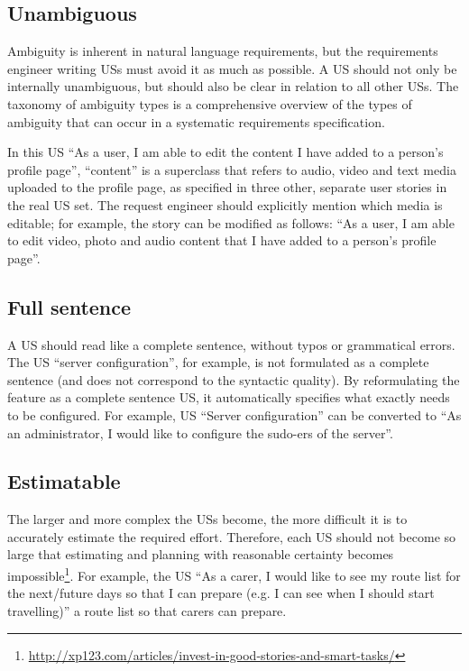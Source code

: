 \subsection*{\normalsize{Unambiguous}}
Ambiguity is inherent in natural language requirements, but the requirements engineer writing USs must avoid it as much as possible. A US should not only be internally unambiguous, but should also be clear in relation to all other USs. The taxonomy of ambiguity types \cite{berry2004ambiguity} is a comprehensive overview of the types of ambiguity that can occur in a systematic requirements specification.

In this US \enquote{As a user, I am able to edit the content I have added to a person's profile page}, \enquote{content} is a superclass that refers to audio, video and text media uploaded to the profile page, as specified in three other, separate user stories in the real US set. The request engineer should explicitly mention which media is editable; for example, the story can be modified as follows: \enquote{As a user, I am able to edit video, photo and audio content that I have added to a person's profile page}.
\subsection*{\normalsize{Full sentence}}
A US should read like a complete sentence, without typos or grammatical errors. The US \enquote{server configuration}, for example, is not formulated as a complete sentence (and does not correspond to the syntactic quality). By reformulating the feature as a complete sentence US, it automatically specifies what exactly needs to be configured. For example, US \enquote{Server configuration} can be converted to \enquote{As an administrator, I would like to configure the sudo-ers of the server}.
\subsection*{\normalsize{Estimatable}}
The larger and more complex the USs become, the more difficult it is to accurately estimate the required effort. Therefore, each US should not become so large that estimating and planning with reasonable certainty becomes impossible\footnote{\href{http://xp123.com/articles/invest-in-good-stories-and-smart-tasks/}{http://xp123.com/articles/invest-in-good-stories-and-smart-tasks/}}. For example, the US \enquote{As a carer, I would like to see my route list for the next/future days so that I can prepare (e.g. I can see when I should start travelling)} a route list so that carers can prepare. 


